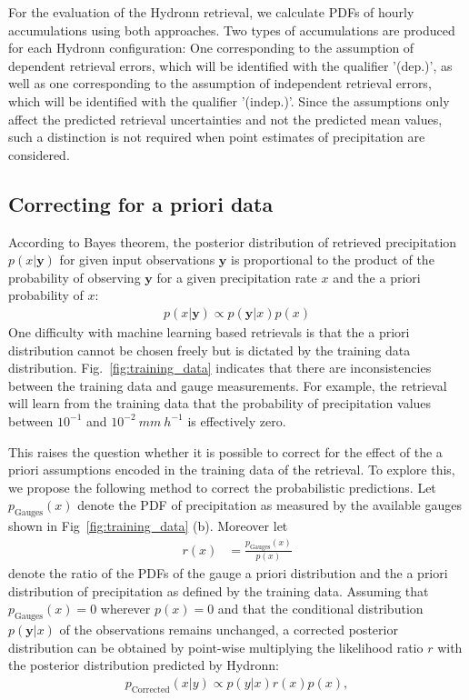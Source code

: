 \documentclass[journal abbreviation, manuscript]{copernicus}
\begin{document}
For the evaluation of the Hydronn retrieval, we calculate PDFs of hourly
accumulations using both approaches. Two types of accumulations are produced for
each Hydronn configuration: One corresponding to the assumption of dependent
retrieval errors, which will be identified with the qualifier '(dep.)', as well as
one corresponding to the assumption of independent retrieval errors, which will
be identified with the qualifier '(indep.)'. Since the assumptions only affect
the predicted retrieval uncertainties and not the predicted mean values, such a
distinction is not required when point estimates of precipitation are
considered.

\subsection{Correcting for a priori data}
\label{sec:correction}

According to Bayes theorem, the posterior distribution of  retrieved
precipitation $p(x|\mathbf{y})$ for  given input observations $\mathbf{y}$ is
proportional to the product of the probability of observing $\mathbf{y}$ for a
given precipitation rate $x$ and the a priori probability of $x$:
\begin{align}
  p(x|\mathbf{y}) \propto p(\mathbf{y}|x) p(x)
\end{align}
 One difficulty with machine learning based retrievals is that the a priori
 distribution cannot be chosen freely but is dictated by the training data
 distribution. Fig.~\ref{fig:training_data} indicates that there are
 inconsistencies between the training data and gauge measurements. For example,
 the retrieval will learn from the training data that the probability of
 precipitation values between $10^{-1}$ and $10^{-2}\ \unit{mm\ h^{-1}}$ is
 effectively zero.

This raises the question whether it is possible to correct for the effect of the
a priori assumptions encoded in the training data of the retrieval. To explore
this, we propose the following method to correct the probabilistic predictions.
Let $p_\text{Gauges}(x)$ denote the PDF of precipitation as measured by the
available gauges shown in Fig~\ref{fig:training_data} (b). Moreover let
\begin{align}
  r(x) &= \frac{p_\text{Gauges}(x)}{p(x)}
 \end{align}
denote the ratio of the PDFs of the gauge a priori distribution and the a priori
distribution of precipitation as defined by the training data. Assuming that
$p_\text{Gauges}(x) = 0$ wherever $p(x) = 0$ and that the conditional
distribution $p(\mathbf{y}|x)$ of the observations remains unchanged, a
corrected posterior distribution can be obtained by point-wise multiplying the
likelihood ratio $r$ with the posterior distribution predicted by Hydronn:
\begin{align}
  p_\text{Corrected}(x|y) \propto p(y|x) r(x) p(x),
\end{align}
\end{document}
